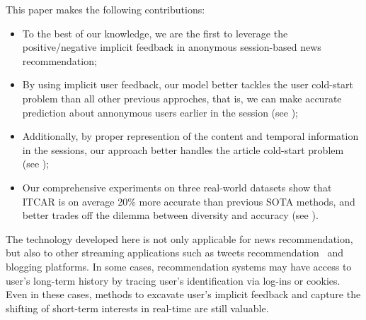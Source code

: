 This paper makes the following contributions: 
\begin{itemize}
    \item To the best of our knowledge, we are the first to leverage 
the positive/negative implicit feedback in anonymous session-based news recommendation;
    \item By using implicit user feedback, our model better
tackles the user cold-start problem than all other previous approches, that is, we can
make accurate prediction about annonymous users earlier in the session (see 
);
    \item Additionally, by proper represention of the content and  temporal information in 
the sessions, our approach better handles the article cold-start problem
(see );
    \item Our comprehensive experiments on three real-world 
datasets show that ITCAR is on average 20\% more accurate than
previous SOTA methods, and better trades off the dilemma between 
diversity and accuracy (see ). 
\end{itemize}

The technology developed here is not only applicable for news recommendation, but also
to other streaming applications such as tweets recommendation~\cite{kwak_what_2010} 
and blogging platforms.  In some cases, recommendation systems may have access to 
user's long-term history by tracing user's identification via log-ins or cookies. 
Even in these cases, methods to excavate user's implicit feedback and 
capture the shifting of short-term interests in real-time are still valuable.
